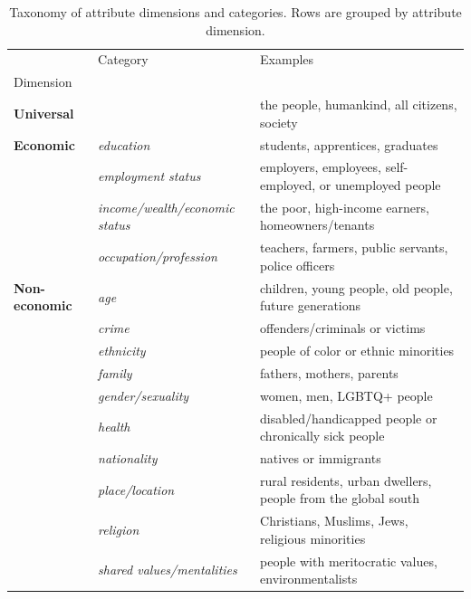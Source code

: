 \begin{table}[!ht]
\centering
\footnotesize
\caption{Taxonomy of attribute dimensions and categories. Rows are grouped by attribute dimension.}
\label{table01}
\begin{tabular}{L{4.2cm}p{5cm}H{6cm}}
\toprule
 & Category & Examples \\
Dimension &  &  \\
\midrule
\textbf{Universal} &  & the people, humankind, all citizens, society \\
\textbf{Economic} & \textit{education} & students, apprentices, graduates \\
  & \textit{employment status} & employers, employees, self-employed, or unemployed people \\
  & \textit{income/wealth/economic status} & the poor, high-income earners, homeowners/tenants \\
  & \textit{occupation/profession} & teachers, farmers, public servants, police officers \\
\textbf{Non-economic} & \textit{age} & children, young people, old people, future generations \\
  & \textit{crime} & offenders/criminals or victims \\
  & \textit{ethnicity} & people of color or ethnic minorities \\
  & \textit{family} & fathers, mothers, parents \\
  & \textit{gender/sexuality} & women, men, LGBTQ+ people \\
  & \textit{health} & disabled/handicapped people or chronically sick people \\
  & \textit{nationality} & natives or immigrants \\
  & \textit{place/location} & rural residents, urban dwellers, people from the global south \\
  & \textit{religion} & Christians, Muslims, Jews, religious minorities \\
  & \textit{shared values/mentalities} & people with meritocratic values, environmentalists \\
\bottomrule
\end{tabular}
\end{table}
